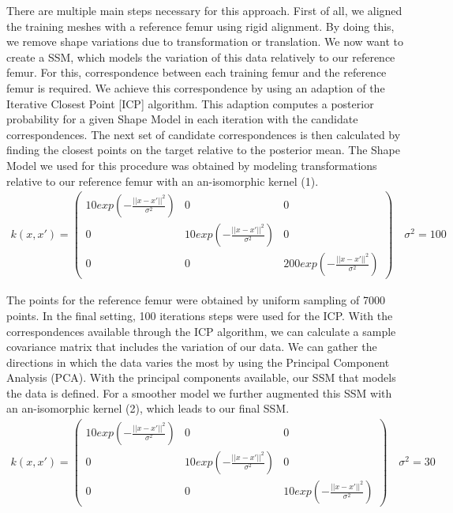 \documentclass{article}
\begin{document}
	There are multiple main steps necessary for this approach. First of all, we aligned the training meshes with a reference femur using rigid alignment. By doing this, we remove shape variations due to transformation or translation. We now want to create a SSM, which models the variation of this data relatively to our reference femur. For this, correspondence between each training femur and the reference femur is required. We achieve this correspondence by using an adaption of the Iterative Closest Point [ICP] algorithm. This adaption computes a posterior probability for a given Shape Model in each iteration with the candidate correspondences. The next set of candidate correspondences is then calculated by finding the closest points on the target relative to the posterior mean.
	The Shape Model we used for this procedure was obtained by modeling transformations relative to our reference femur with an an-isomorphic kernel (1).
	\begin{align}
	k(x, x') =
	\begin{pmatrix}
	10 exp(-\frac{||x-x'||^2}{\sigma^2})       & 0 & 0 \\
	0      & 10 exp(-\frac{||x-x'||^2}{\sigma^2}) & 0  \\
	0      & 0 &  200 exp(-\frac{||x-x'||^2}{\sigma^2})
	\end{pmatrix}
	\quad \sigma^2 = 100
	\end{align}
	
	The points for the reference femur were obtained by uniform sampling of 7000 points. In the final setting, 100 iterations steps were used for the ICP. With the correspondences available through the ICP algorithm, we can calculate a sample covariance matrix that includes the variation of our data. We can gather the directions in which the data varies the most by using the Principal Component Analysis (PCA). With the principal components available, our SSM that models the data is defined. For a smoother model we further augmented this SSM with an an-isomorphic kernel (2), which leads to our final SSM.
	\begin{align}
	k(x, x') =
	\begin{pmatrix}
	10 exp(-\frac{||x-x'||^2}{\sigma^2})       & 0 & 0 \\
	0      & 10 exp(-\frac{||x-x'||^2}{\sigma^2}) & 0  \\
	0      & 0 &  10 exp(-\frac{||x-x'||^2}{\sigma^2})
	\end{pmatrix}
	\quad \sigma^2 = 30
	\end{align}
	
\end{document}
